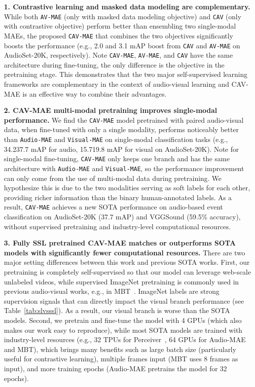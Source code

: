 \documentclass{article} \usepackage{iclr2023_conference,times}
\begin{document}
\textbf{1. Contrastive learning and masked data modeling are complementary.} While both \texttt{AV-MAE} (only with masked data modeling objective) and \texttt{CAV} (only with contrastive objective) perform better than ensembling two single-modal MAEs, the proposed \texttt{CAV-MAE} that combines the two objectives significantly boosts the performance (e.g., 2.0 and 3.1 mAP boost from \texttt{CAV} and \texttt{AV-MAE} on AudioSet-20K, respectively). Note \texttt{CAV-MAE}, \texttt{AV-MAE}, and \texttt{CAV} have the same architecture during fine-tuning, the only difference is the objective in the pretraining stage. This demonstrates that the two major self-supervised learning frameworks are complementary in the context of audio-visual learning and CAV-MAE is an effective way to combine their advantages.

\textbf{2. CAV-MAE multi-modal pretraining improves single-modal performance.} We find the \texttt{CAV-MAE} model pretrained with paired audio-visual data, when fine-tuned with only a single modality, performs noticeably better than \texttt{Audio-MAE} and \texttt{Visual-MAE} on single-modal classification tasks (e.g., 34.237.7 mAP for audio, 15.719.8 mAP for visual on AudioSet-20K). Note for single-modal fine-tuning,  \texttt{CAV-MAE} only keeps one branch and has the same architecture with \texttt{Audio-MAE} and \texttt{Visual-MAE}, so the performance improvement can only come from the use of multi-modal data during pretraining. We hypothesize this is due to the two modalities serving as soft labels for each other, providing richer information than the binary human-annotated labels. As a result, \texttt{CAV-MAE} achieves a new SOTA performance on audio-based event classification on AudioSet-20K (37.7 mAP) and VGGSound (59.5\% accuracy), without supervised pretraining and industry-level computational resources.

\textbf{3. Fully SSL pretrained CAV-MAE matches or outperforms SOTA models with significantly fewer computational resources.} There are two major setting differences between this work and previous SOTA works. First, our pretraining is completely self-supervised so that our model can leverage web-scale unlabeled videos, while supervised ImageNet pretraining is commonly used in previous audio-visual works, e.g., in MBT~\citep{nagrani2021attention}. ImageNet labels are strong supervision signals that can directly impact the visual branch performance (see Table~\ref{tab:slvsssl}). As a result, our visual branch is worse than the SOTA models. Second, we pretrain and fine-tune the model with 4 GPUs (which also makes our work easy to reproduce), while most SOTA models are trained with industry-level resources (e.g., 32 TPUs for Perceiver~\citep{jaegle2021perceiver}, 64 GPUs for Audio-MAE~\citep{xu2022masked} and MBT), which brings many benefits such as large batch size (particularly useful for contrastive learning), multiple frames input (MBT uses 8 frames as input), and more training epochs (Audio-MAE pretrains the model for 32 epochs).
\end{document}
